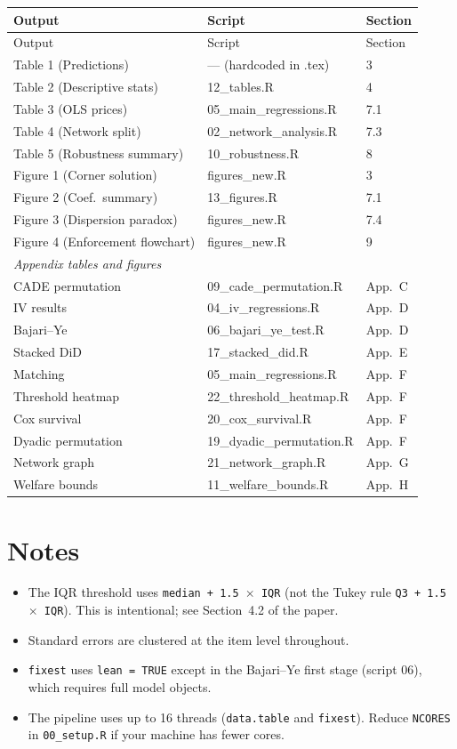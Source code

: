 \documentclass[11pt]{article}
\begin{document}
\begin{longtable}{lll}
\toprule
Output & Script & Section \\
\midrule
\endfirsthead
\toprule
Output & Script & Section \\
\midrule
\endhead
Table 1 (Predictions) & --- (hardcoded in .tex) & 3 \\
Table 2 (Descriptive stats) & 12\_tables.R & 4 \\
Table 3 (OLS prices) & 05\_main\_regressions.R & 7.1 \\
Table 4 (Network split) & 02\_network\_analysis.R & 7.3 \\
Table 5 (Robustness summary) & 10\_robustness.R & 8 \\
Figure 1 (Corner solution) & figures\_new.R & 3 \\
Figure 2 (Coef.\ summary) & 13\_figures.R & 7.1 \\
Figure 3 (Dispersion paradox) & figures\_new.R & 7.4 \\
Figure 4 (Enforcement flowchart) & figures\_new.R & 9 \\
\midrule
\multicolumn{3}{l}{\textit{Appendix tables and figures}} \\
\midrule
CADE permutation & 09\_cade\_permutation.R & App.\ C \\
IV results & 04\_iv\_regressions.R & App.\ D \\
Bajari--Ye & 06\_bajari\_ye\_test.R & App.\ D \\
Stacked DiD & 17\_stacked\_did.R & App.\ E \\
Matching & 05\_main\_regressions.R & App.\ F \\
Threshold heatmap & 22\_threshold\_heatmap.R & App.\ F \\
Cox survival & 20\_cox\_survival.R & App.\ F \\
Dyadic permutation & 19\_dyadic\_permutation.R & App.\ F \\
Network graph & 21\_network\_graph.R & App.\ G \\
Welfare bounds & 11\_welfare\_bounds.R & App.\ H \\
\bottomrule
\end{longtable}

\section{Notes}

\begin{itemize}
\item The IQR threshold uses \texttt{median + 1.5 $\times$ IQR} (not
  the Tukey rule \texttt{Q3 + 1.5 $\times$ IQR}). This is intentional;
  see Section~4.2 of the paper.
\item Standard errors are clustered at the item level throughout.
\item \texttt{fixest} uses \texttt{lean = TRUE} except in the
  Bajari--Ye first stage (script 06), which requires full model objects.
\item The pipeline uses up to 16 threads (\texttt{data.table} and
  \texttt{fixest}). Reduce \texttt{NCORES} in \texttt{00\_setup.R} if
  your machine has fewer cores.
\end{itemize}
\end{document}
